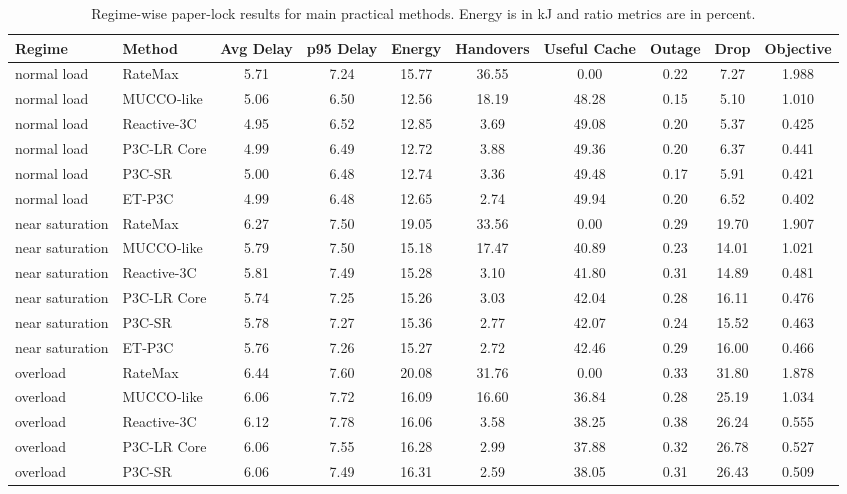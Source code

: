 \begin{table}[!t]
\centering
\caption{Regime-wise paper-lock results for main practical methods. Energy is in kJ and ratio metrics are in percent.}
\label{tab:regime_results}
\tiny
\begin{tabular}{llcccccccc}
\toprule
Regime & Method & Avg Delay & p95 Delay & Energy & Handovers & Useful Cache & Outage & Drop & Objective \\
\midrule
normal load & RateMax & 5.71 & 7.24 & 15.77 & 36.55 & 0.00 & 0.22 & 7.27 & 1.988 \\
normal load & MUCCO-like & 5.06 & 6.50 & 12.56 & 18.19 & 48.28 & 0.15 & 5.10 & 1.010 \\
normal load & Reactive-3C & 4.95 & 6.52 & 12.85 & 3.69 & 49.08 & 0.20 & 5.37 & 0.425 \\
normal load & P3C-LR Core & 4.99 & 6.49 & 12.72 & 3.88 & 49.36 & 0.20 & 6.37 & 0.441 \\
normal load & P3C-SR & 5.00 & 6.48 & 12.74 & 3.36 & 49.48 & 0.17 & 5.91 & 0.421 \\
normal load & ET-P3C & 4.99 & 6.48 & 12.65 & 2.74 & 49.94 & 0.20 & 6.52 & 0.402 \\
near saturation & RateMax & 6.27 & 7.50 & 19.05 & 33.56 & 0.00 & 0.29 & 19.70 & 1.907 \\
near saturation & MUCCO-like & 5.79 & 7.50 & 15.18 & 17.47 & 40.89 & 0.23 & 14.01 & 1.021 \\
near saturation & Reactive-3C & 5.81 & 7.49 & 15.28 & 3.10 & 41.80 & 0.31 & 14.89 & 0.481 \\
near saturation & P3C-LR Core & 5.74 & 7.25 & 15.26 & 3.03 & 42.04 & 0.28 & 16.11 & 0.476 \\
near saturation & P3C-SR & 5.78 & 7.27 & 15.36 & 2.77 & 42.07 & 0.24 & 15.52 & 0.463 \\
near saturation & ET-P3C & 5.76 & 7.26 & 15.27 & 2.72 & 42.46 & 0.29 & 16.00 & 0.466 \\
overload & RateMax & 6.44 & 7.60 & 20.08 & 31.76 & 0.00 & 0.33 & 31.80 & 1.878 \\
overload & MUCCO-like & 6.06 & 7.72 & 16.09 & 16.60 & 36.84 & 0.28 & 25.19 & 1.034 \\
overload & Reactive-3C & 6.12 & 7.78 & 16.06 & 3.58 & 38.25 & 0.38 & 26.24 & 0.555 \\
overload & P3C-LR Core & 6.06 & 7.55 & 16.28 & 2.99 & 37.88 & 0.32 & 26.78 & 0.527 \\
overload & P3C-SR & 6.06 & 7.49 & 16.31 & 2.59 & 38.05 & 0.31 & 26.43 & 0.509 \\

\end{tabular}
\end{table}
